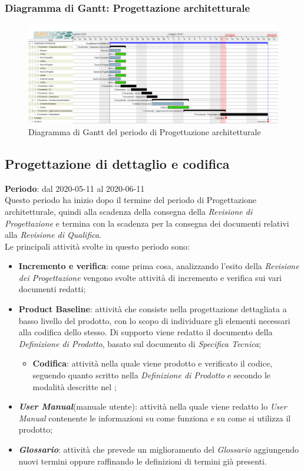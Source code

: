 	\subsubsection{Diagramma di Gantt: Progettazione architetturale}
		\begin{figure}[h]
			\centering
			\includegraphics[width=1.1\textwidth]{./res/img/DiagrammiGantt/prog_arch_gantt.png}
			\caption{Diagramma di Gantt del periodo di Progettazione architetturale}
		\end{figure}
\newpage
\subsection{Progettazione di dettaglio e codifica}
\textbf{Periodo}: dal 2020-05-11 al 2020-06-11 \\
Questo periodo ha inizio dopo il termine del periodo di Progettazione architetturale, quindi alla scadenza della consegna della \textit{Revisione di Progettazione} e termina con la scadenza per la consegna dei documenti relativi alla \textit{Revisione di Qualifica}. \\
Le principali attività svolte in questo periodo sono:
\begin{itemize}
	\item \textbf{Incremento e verifica}: come prima cosa, analizzando l'esito della \textit{Revisione dei Progettazione} vengono svolte attività di incremento e verifica sui vari documenti redatti;
	\item \textbf{Product Baseline}: attività che consiste nella progettazione dettagliata a basso livello del prodotto, con lo scopo di individuare gli elementi necessari alla codifica dello stesso. Di supporto viene redatto il documento della \textit{Definizione di Prodotto}, basato sul documento di \textit{Specifica Tecnica};
	\begin{itemize}
		\item \textbf{Codifica}: attività nella quale viene prodotto e verificato il codice, seguendo quanto scritto nella \textit{Definizione di Prodotto} e secondo le modalità descritte nel \textit{\PdQ{}};
	\end{itemize}
	\item \textbf{\textit{User Manual}}(manuale utente): attività nella quale viene redatto lo \textit{User Manual} contenente le informazioni su come funziona e su come si utilizza il prodotto;
	\item \textbf{\textit{Glossario}}: attività che prevede un miglioramento del \textit{Glossario} aggiungendo nuovi termini oppure raffinando le definizioni di termini già presenti.
\end{itemize}
